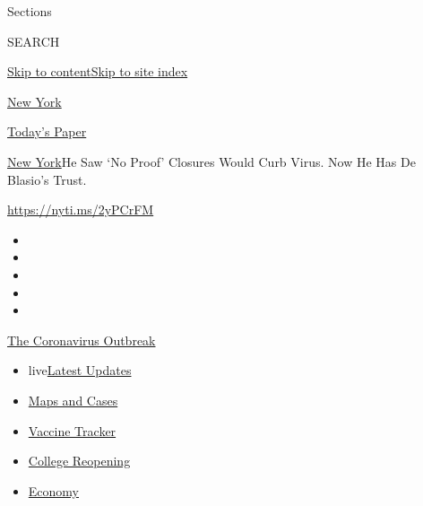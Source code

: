 Sections

SEARCH

\protect\hyperlink{site-content}{Skip to
content}\protect\hyperlink{site-index}{Skip to site index}

\href{https://www.nytimes3xbfgragh.onion/section/nyregion}{New York}

\href{https://myaccount.nytimes3xbfgragh.onion/auth/login?response_type=cookie\&client_id=vi}{}

\href{https://www.nytimes3xbfgragh.onion/section/todayspaper}{Today's
Paper}

\href{/section/nyregion}{New York}\textbar{}He Saw `No Proof' Closures
Would Curb Virus. Now He Has De Blasio's Trust.

\url{https://nyti.ms/2yPCrFM}

\begin{itemize}
\item
\item
\item
\item
\item
\end{itemize}

\href{https://www.nytimes3xbfgragh.onion/news-event/coronavirus?action=click\&pgtype=Article\&state=default\&region=TOP_BANNER\&context=storylines_menu}{The
Coronavirus Outbreak}

\begin{itemize}
\tightlist
\item
  live\href{https://www.nytimes3xbfgragh.onion/2020/08/04/world/coronavirus-cases.html?action=click\&pgtype=Article\&state=default\&region=TOP_BANNER\&context=storylines_menu}{Latest
  Updates}
\item
  \href{https://www.nytimes3xbfgragh.onion/interactive/2020/us/coronavirus-us-cases.html?action=click\&pgtype=Article\&state=default\&region=TOP_BANNER\&context=storylines_menu}{Maps
  and Cases}
\item
  \href{https://www.nytimes3xbfgragh.onion/interactive/2020/science/coronavirus-vaccine-tracker.html?action=click\&pgtype=Article\&state=default\&region=TOP_BANNER\&context=storylines_menu}{Vaccine
  Tracker}
\item
  \href{https://www.nytimes3xbfgragh.onion/2020/08/02/us/covid-college-reopening.html?action=click\&pgtype=Article\&state=default\&region=TOP_BANNER\&context=storylines_menu}{College
  Reopening}
\item
  \href{https://www.nytimes3xbfgragh.onion/live/2020/08/04/business/stock-market-today-coronavirus?action=click\&pgtype=Article\&state=default\&region=TOP_BANNER\&context=storylines_menu}{Economy}
\end{itemize}

